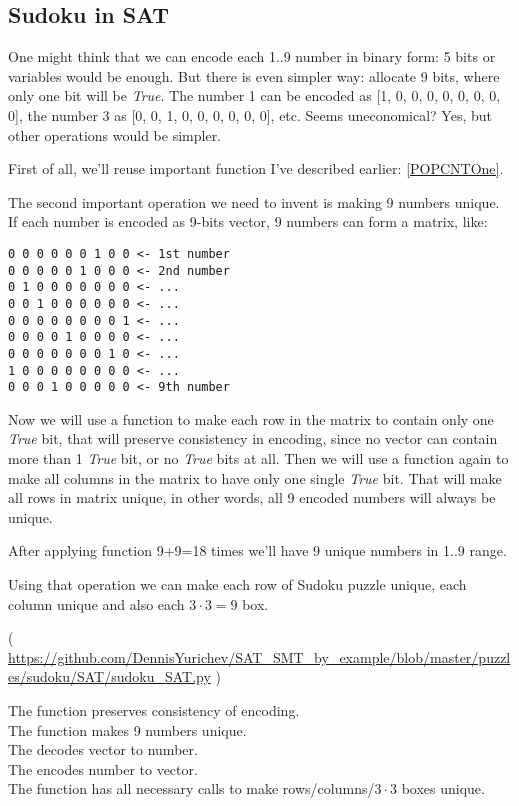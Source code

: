 \subsection{Sudoku in SAT}
\label{Sudoku_SAT}

One might think that we can encode each 1..9 number in binary form: 5 bits or variables would be enough.
But there is even simpler way: allocate 9 bits, where only one bit will be \emph{True}.
The number 1 can be encoded as [1, 0, 0, 0, 0, 0, 0, 0, 0], the number 3 as [0, 0, 1, 0, 0, 0, 0, 0, 0], etc.
Seems uneconomical? Yes, but other operations would be simpler.

First of all, we'll reuse important  function I've described earlier: \ref{POPCNTOne}.

The second important operation we need to invent is making 9 numbers unique.
If each number is encoded as 9-bits vector, 9 numbers can form a matrix, like:

\begin{lstlisting}
0 0 0 0 0 0 1 0 0 <- 1st number
0 0 0 0 0 1 0 0 0 <- 2nd number
0 1 0 0 0 0 0 0 0 <- ...
0 0 1 0 0 0 0 0 0 <- ...
0 0 0 0 0 0 0 0 1 <- ...
0 0 0 0 1 0 0 0 0 <- ...
0 0 0 0 0 0 0 1 0 <- ...
1 0 0 0 0 0 0 0 0 <- ...
0 0 0 1 0 0 0 0 0 <- 9th number
\end{lstlisting}

Now we will use a  function to make each row in the matrix to contain only one \emph{True} bit, that will
preserve consistency in encoding, since no vector can contain more than 1 \emph{True} bit, or no \emph{True} bits at all.
Then we will use a  function again to make all columns in the matrix to have only one single \emph{True} bit.
That will make all rows in matrix unique, in other words, all 9 encoded numbers will always be unique.

After applying  function 9+9=18 times we'll have 9 unique numbers in 1..9 range.

Using that operation we can make each row of Sudoku puzzle unique, each column unique and also each $3 \cdot 3=9$ box.


( \url{https://github.com/DennisYurichev/SAT_SMT_by_example/blob/master/puzzles/sudoku/SAT/sudoku_SAT.py} )

The  function preserves consistency of encoding.\\
The  function makes 9 numbers unique.\\
The  decodes vector to number.\\
The  encodes number to vector.\\
The  function has all necessary calls to make rows/columns/$3\cdot 3$ boxes unique.


